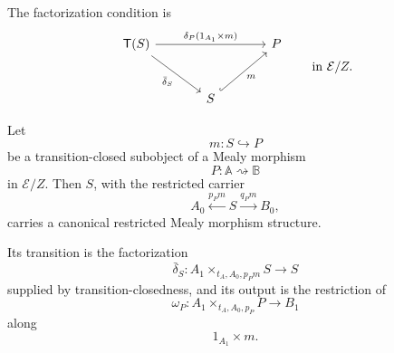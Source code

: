 The factorization condition is
\[
    \begin{tikzcd}[column sep=large, row sep=large]
            \mathsf T(S)
                \arrow[rr, "{\delta_P(1_{A_1}\times m)}"]
                \arrow[dr, "\bar\delta_S"']
        &
        &
            P
        \\
        &
            S
                \arrow[ur, hook, "m"']
        &
    \end{tikzcd}
    \qquad
    \text{in }\mathcal E/Z.
\]

\begin{lemma}
\label{lem:restriction-transition-closed-subobject}
    Let
    \[
        m:S\hookrightarrow P
    \]
    be a transition-closed subobject of a Mealy morphism
    \[
        P:\mathbb A\rightsquigarrow\mathbb B
    \]
    in \(\mathcal E/Z\). Then \(S\), with the restricted carrier
    \[
        A_0\xleftarrow{p_Pm}S\xrightarrow{q_Pm}B_0,
    \]
    carries a canonical restricted Mealy morphism structure.

    Its transition is the factorization
    \[
        \bar\delta_S:
        A_1\times_{t_A,A_0,p_Pm}S\to S
    \]
    supplied by transition-closedness, and its output is the restriction of
    \[
        \omega_P:
        A_1\times_{t_A,A_0,p_P}P\to B_1
    \]
    along
    \[
        1_{A_1}\times m.
    \]
\end{lemma}
